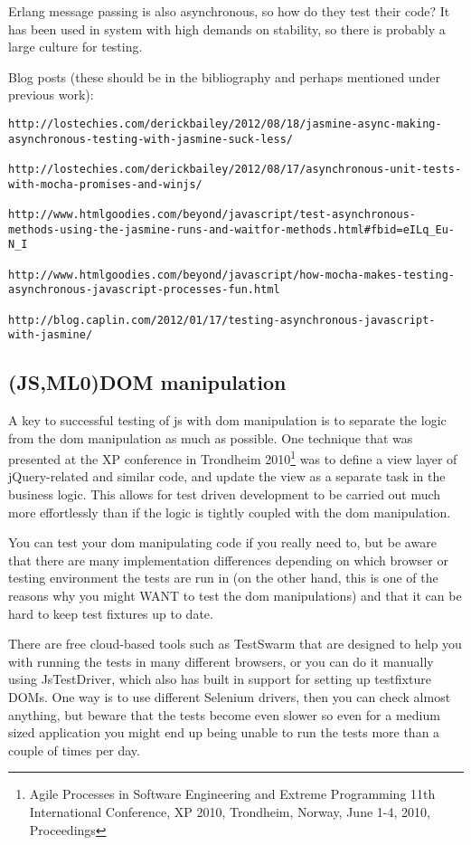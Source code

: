 \documentclass[11pt]{article}
\begin{document}
Erlang message passing is also asynchronous, so how do they test their code? It has been used in system with high demands on stability, so there is probably a large culture for testing.

Blog posts (these should be in the bibliography and perhaps mentioned under previous work):
\begin{verbatim}
http://lostechies.com/derickbailey/2012/08/18/jasmine-async-making-asynchronous-testing-with-jasmine-suck-less/

http://lostechies.com/derickbailey/2012/08/17/asynchronous-unit-tests-with-mocha-promises-and-winjs/

http://www.htmlgoodies.com/beyond/javascript/test-asynchronous-methods-using-the-jasmine-runs-and-waitfor-methods.html#fbid=eILq_Eu-N_I

http://www.htmlgoodies.com/beyond/javascript/how-mocha-makes-testing-asynchronous-javascript-processes-fun.html

http://blog.caplin.com/2012/01/17/testing-asynchronous-javascript-with-jasmine/
\end{verbatim}

\subsection{(JS,ML0)DOM manipulation}

A key to successful testing of \gls{js} with \gls{dom} manipulation is to separate the logic from the \gls{dom} manipulation as much as possible. One technique that was presented at the XP conference in Trondheim 2010\footnote{Agile Processes in Software Engineering and Extreme Programming 11th International Conference, XP 2010, Trondheim, Norway, June 1-4, 2010, Proceedings} was to define a view layer of jQuery-related and similar code, and update the view as a separate task in the business logic. This allows for test driven development to be carried out much more effortlessly than if the logic is tightly coupled with the \gls{dom} manipulation. \cite[question~4]{Ahnve}

You can test your \gls{dom} manipulating code if you really need to, but be aware that there are many implementation differences depending on which browser or testing environment the tests are run in (on the other hand, this is one of the reasons why you might WANT to test the \gls{dom} manipulations) and that it can be hard to keep test fixtures up to date.

There are free cloud-based tools such as TestSwarm that are designed to help you with running the tests in many different browsers, or you can do it manually using JsTestDriver, which also has built in support for setting up
\gls{testfixture} DOMs. One way is to use different Selenium drivers, then you can check almost anything, but beware that the tests become even slower so even for a medium sized application you might end up being unable to run the tests more than a couple of times per day.
\end{document}
